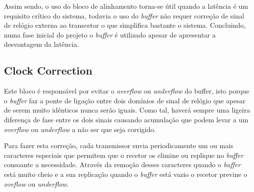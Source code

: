 Assim sendo, o uso do bloco de alinhamento torna-se útil quando a latência é um requisito crítico do sistema, todavia o uso do \textit{buffer} não requer correção de sinal de relógio externa ao transcetor o que simplifica bastante o sistema. Concluindo, numa fase inicial do projeto o \textit{buffer} é utilizado apesar de apresentar a desvantagem da latência.


\subsection{Clock Correction}


	
Este bloco é responsável por evitar o \textit{overflow} ou \textit{underflow} do buffer, isto porque o \textit{buffer} faz a ponte de ligação entre dois domínios de sinal de relógio que apesar de serem muito idênticos nunca serão iguais. Como tal, haverá sempre uma ligeira diferença de fase entre os dois sinais causando acumulação que podem levar a um \textit{overflow} ou \textit{underflow} a não ser que seja corrigido. 

Para fazer esta correção, cada transmissor envia periodicamente um ou mais caracteres especiais que permitem que o recetor os elimine ou replique no \textit{buffer} consoante a necessidade. Através da remoção desses caracteres quando o \textit{buffer} está muito cheio e a sua replicação quando o \textit{buffer} está vazio o recetor previne o \textit{oveflow} ou \textit{underflow}. 


	
%
%
%
%


	
	
	
	
	
	
	
	
	
	
	
	
